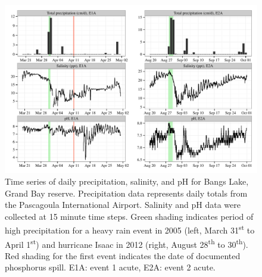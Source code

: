 \documentclass[letterpaper,12pt]{article}\usepackage[]{graphicx}\usepackage[]{color}
\makeatletter
\def\maxwidth{ %
  \ifdim\Gin@nat@width>\linewidth
    \linewidth
  \else
    \Gin@nat@width
  \fi
}
\makeatother
\begin{document}
\begin{figure}[!ht]

{\centering \includegraphics[width=\maxwidth]{figs/tsplotexp-1} 

}

\caption[Time series of daily precipitation, salinity, and pH for Bangs Lake, Grand Bay reserve]{Time series of daily precipitation, salinity, and pH for Bangs Lake, Grand Bay reserve.  Precipitation data represents daily totals from the Pascagoula International Airport.  Salinity and pH data were collected at 15 minute time steps.  Green shading indicates period of high precipitation for a heavy rain event in 2005 (left, March 31\textsuperscript{st} to April 1\textsuperscript{st}) and hurricane Isaac in 2012 (right, August 28\textsuperscript{th} to 30\textsuperscript{th}).  Red shading for the first event indicates the date of documented phosphorus spill.  E1A: event 1 acute, E2A: event 2 acute.}\label{fig:tsplotexp}
\end{figure}


\clearpage
\end{document}
